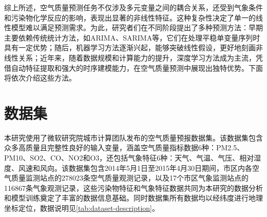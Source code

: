综上所述，空气质量预测任务不仅涉及多元变量之间的耦合关系，还受到气象条件和污染物化学反应的影响，表现出显著的非线性特征。这种复杂性决定了单一的线性模型难以满足预测需求。为此，研究者们在不同阶段提出了多种预测方法：早期主要依赖传统统计方法，如ARIMA、SARIMA等，它们在处理平稳单变量序列时具有一定优势；随后，机器学习方法逐渐兴起，能够突破线性假设，更好地刻画非线性关系；近年来，随着数据规模和计算能力的提升，深度学习方法成为主流，凭借自动特征提取和强大的时序建模能力，在空气质量预测中展现出独特优势。下面将依次介绍这些方法。

\section{数据集}\label{sec:dataset}

本研究使用了微软研究院城市计算团队发布的空气质量预报数据集\cite{zheng_forecasting_2015}。该数据集包含众多高质量且完整性良好的输入变量，涵盖空气质量指标数据6种：PM2.5、PM10、SO2、CO、NO2和O3，还包括气象特征6种：天气、气温、气压、相对湿度、风速和风向。该数据集包含2014年5月1日至2015年4月30日期间，市区内各空气质量监测站点的278023条空气质量观测记录，以及17个市区气象监测站点的116867条气象观测记录，这些污染物特征和气象特征数据共同为本研究的数据分析和模型训练奠定了丰富的数据信息基础。同时数据集所有数据均以经纬度进行地理坐标定位，数据说明见\cref{tab:dataset-description}。

